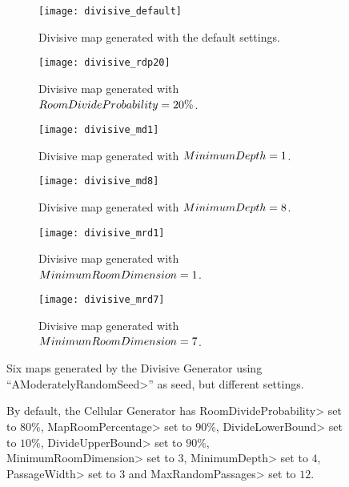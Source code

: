 \begin{figure}[tp]
	\centering
  	\begin{subfigure}[t]{0.325\linewidth}
		\texttt{[image: divisive\_default]}
     		\caption{Divisive map generated with the default settings.}
 	\end{subfigure}
  	\begin{subfigure}[t]{0.325\linewidth}
    		\texttt{[image: divisive\_rdp20]}
    		\caption{Divisive map generated with $Room\-Di\-vide\-Prob\-a\-bil\-i\-ty = 20\%$.}
  	\end{subfigure}
  	\begin{subfigure}[t]{0.325\linewidth}
    		\texttt{[image: divisive\_md1]}
    		\caption{Divisive map generated with $Min\-i\-mum\-Depth = 1$.}
  	\end{subfigure}
  	\begin{subfigure}[t]{0.325\linewidth}
		\texttt{[image: divisive\_md8]}
     		\caption{Divisive map generated with $Min\-i\-mum\-Depth= 8$.}
 	\end{subfigure}
  	\begin{subfigure}[t]{0.325\linewidth}
    		\texttt{[image: divisive\_mrd1]}
     		\caption{Divisive map generated with $Min\-i\-mum\-Room\-Di\-men\-sion = 1$.}
  	\end{subfigure}
  	\begin{subfigure}[t]{0.325\linewidth}
    		\texttt{[image: divisive\_mrd7]}
     		\caption{Divisive map generated with $Min\-i\-mum\-Room\-Di\-men\-sion = 7$.}
  	\end{subfigure}	
	\caption{Six maps generated by the Divisive Generator using ``\<AModeratelyRandomSeed>'' as seed, but different settings.}
	\caption*{By default, the Cellular Generator has \<Room\-Di\-vide\-Prob\-a\-bil\-i\-ty> set to $80\%$, \<Map\-Room\-Per\-cent\-age> set to $90\%$,  \<Di\-vide\-Low\-er\-Bound> set to $10\%$,  \<Di\-vide\-Up\-per\-Bound> set to $90\%$,  \<Min\-i\-mum\-Room\-Di\-men\-sion> set to $3$, \<Min\-i\-mum\-Depth> set to $4$, \<Pas\-sage\-Width> set to $3$ and \<Max\-Ran\-dom\-Pas\-sages> set to $12$.}
	\label{fig:divisives}
\end{figure}


